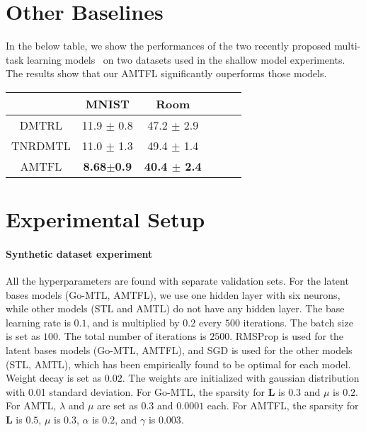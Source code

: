 \documentclass{article}
\newcommand{\mat}[1]{\boldsymbol{#1}} %
\begin{document}
		\section{Other Baselines}
		In the below table, we show the performances of the two recently proposed multi-task learning models~\cite{dmtrl,tnrdmtl} on two datasets used in the shallow model experiments. The results show that our AMTFL significantly ouperforms those models.
		\begin{table}[h]
			\small
			\label{tabel:other_baselines}
			\begin{center}
				\begin{tabular}{cccccc}
					& MNIST & Room \\
					\hline
					\hline
					DMTRL   & 11.9 $\pm$ 0.8 & 47.2 $\pm$ 2.9 \\
					TNRDMTL & 11.0 $\pm$ 1.3 & 49.4 $\pm$ 1.4  \\			
					\hline
					AMTFL & \bf8.68$\pm$0.9& \bf 40.4 $\pm$ 2.4 \\
					\hline
				\end{tabular}
			\end{center}
			\vskip -0.1in
		\end{table}
		
		\section{Experimental Setup}
		
		\paragraph {Synthetic dataset experiment}
		All the hyperparameters are found with separate validation sets. For the latent bases models (Go-MTL, AMTFL), we use one hidden layer with six neurons, while other models (STL and AMTL) do not have any hidden layer. The base learning rate is $0.1$, and is multiplied by $0.2$ every $500$ iterations. The batch size is set as $100$. The total number of iterations is $2500$. RMSProp is used for the latent bases models (Go-MTL, AMTFL), and SGD is used for the other models (STL, AMTL), which has been empirically found to be optimal for each model. Weight decay is set as $0.02$. The weights are initialized with gaussian distribution with 0.01 standard deviation. For Go-MTL, the sparsity for $\mat{L}$ is $0.3$ and $\mu$ is $0.2$. For AMTL, $\lambda$ and $\mu$ are set as $0.3$ and $0.0001$ each. For AMTFL, the sparsity for $\mat{L}$ is $0.5$, $\mu$ is $0.3$, $\alpha$ is $0.2$, and $\gamma$ is $0.003$.
		
\end{document}
